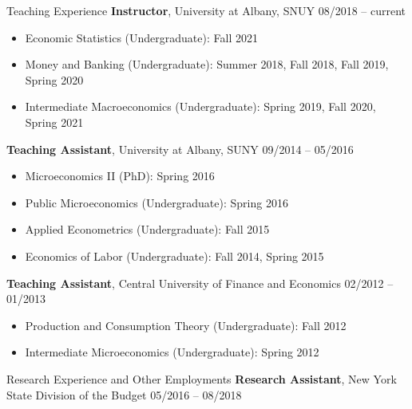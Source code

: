 \documentclass{resume_liang} %
\begin{document}
\begin{rSection}{Teaching Experience}
{\bf Instructor}{, University at Albany, SNUY} \hfill { 08/2018 -- current}
 \begin{itemize}
 	 \item[] Economic Statistics (Undergraduate): Fall 2021
     \item[] Money and Banking (Undergraduate): Summer 2018, Fall 2018, Fall 2019, Spring 2020
     \item[] Intermediate Macroeconomics (Undergraduate): Spring 2019, Fall 2020, Spring 2021
 \end{itemize} 
{\bf Teaching Assistant}{, University at Albany, SUNY} \hfill {09/2014 -- 05/2016}
   \begin{itemize}
     \item[] Microeconomics II (PhD): Spring 2016
     \item[] Public Microeconomics (Undergraduate): Spring 2016
     \item[] Applied Econometrics (Undergraduate): Fall 2015
     \item[] Economics of Labor (Undergraduate): Fall 2014, Spring 2015
   \end{itemize} 
{\bf Teaching Assistant}{, Central University of Finance and Economics} \hfill {02/2012 -- 01/2013}
\begin{itemize}
	\item[] Production and Consumption Theory (Undergraduate): Fall 2012
	\item[] Intermediate Microeconomics (Undergraduate): Spring 2012 
\end{itemize} 
\vspace{0.2cm}
\end{rSection}
\bigskip  




\begin{rSection}{Research Experience and Other Employments}
{\bf Research Assistant}{, New York State Division of the Budget} \hfill {05/2016 -- 08/2018}
\end{rSection}
\bigskip  
\end{document}

